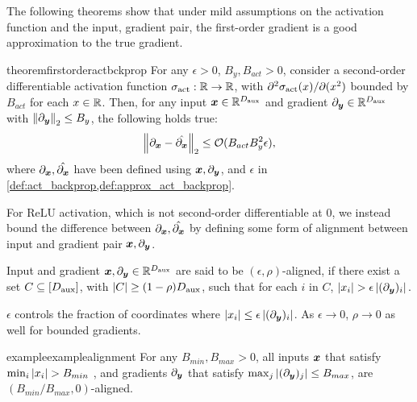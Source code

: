 The following theorems show that under mild assumptions on the activation function and the input, gradient pair, the first-order gradient is a good approximation to the true gradient.


\begin{restatable}{theorem}{firstorderactbckprop}\label{thm:first_order_act_backprop}    
For any $\epsilon > 0$, $B_y, B_{act} > 0$, consider a second-order differentiable activation function $\sigma_{\textrm{act}}: \mathbb{R} \to \mathbb{R}$, with $\partial^2 \sigma_{\textrm{act}} (x) / \partial (x^2) $ bounded by $B_{act}$ for each $x \in \mathbb{R}$. Then, for any  input ${\bm{x}} \in \mathbb{R}^{D_{\text{aux}}}$ and gradient $\partial_{{\bm{y}}} \in \mathbb{R}^{D_{\text{aux}}}$ with $\left\|\partial_{{\bm{y}}}\right\|_{2} \le B_y$, the following holds true:
\begin{align*}
    \left\| \partial_{ {\bm{x}} } - \Hat{ \partial_{ {\bm{x}} } } \right\|_{2} \le \mathcal{O}( B_{act} B_y^2 \epsilon  ),
\end{align*}
where $\partial_{ {\bm{x}} }, \Hat{ \partial_{ {\bm{x}} } }$ have been defined using ${\bm{x}}, \partial_{{\bm{y}}}$, and $\epsilon$ in \cref{def:act_backprop,def:approx_act_backprop}.
\end{restatable}


For $\mathrm{ReLU}$ activation, which is not second-order differentiable at $0$, we instead bound the difference between $\partial_{ {\bm{x}} }, \Hat{ \partial_{ {\bm{x}} } }$ by defining some form of alignment between input and  gradient pair ${\bm{x}}, \partial_{{\bm{y}}}$.

\begin{definition}\label{def:eps-rho_aligned}
Input and gradient ${\bm{x}}, \partial_{{\bm{y}}} \in \mathbb{R}^{D_{\text{aux}}}$ are said to be $(\epsilon, \rho)$-aligned, if there exist a set $C \subseteq [D_{\text{aux}}]$, with  $\left| C \right| \ge (1 - \rho) D_{\text{aux}}$, such that for each $i$ in $C$, $\left| x_i \right| > \epsilon \left|  (\partial_{{\bm{y}}} )_i  \right|.$
\end{definition}

$\epsilon$ controls the fraction of coordinates where $\left| x_i \right| \leq \epsilon \left|  (\partial_{{\bm{y}}} )_i  \right|$. As $\epsilon \to 0$, $\rho \to 0$  as well for bounded gradients. 

\begin{restatable}{example}{examplealignment}
    For any $B_{min}, B_{max} > 0$, all inputs ${\bm{x}}$ that satisfy $\min_i \left| x_i \right| > B_{min}$ , and gradients $\partial_{{\bm{y}}}$ that satisfy $\max_j \left| (\partial_{{\bm{y}}})_j \right| \le B_{max}$, are $( B_{min} / B_{max}, 0)$-aligned.
\end{restatable}
    
